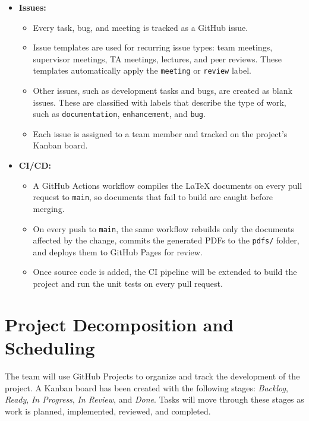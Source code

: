 \documentclass{article}
\begin{document}
\begin{itemize}
\begin{itemize}
    \item Once working software exists, each demonstration (the proof of
    concept, Revision~0, and Revision~1) is also published as a GitHub
    Release from its tag, with a short summary of the features included.
  \end{itemize}
  \item \textbf{Issues:}
  \begin{itemize}
    \item Every task, bug, and meeting is tracked as a GitHub issue.
    \item Issue templates are used for recurring issue types: team meetings,
    supervisor meetings, TA meetings, lectures, and peer reviews. These
    templates automatically apply the \texttt{meeting} or \texttt{review}
    label.
    \item Other issues, such as development tasks and bugs, are created as
    blank issues. These are classified with labels that describe the type of
    work, such as \texttt{documentation}, \texttt{enhancement}, and
    \texttt{bug}.
    \item Each issue is assigned to a team member and tracked on the
    project's Kanban board.
  \end{itemize}
  \item \textbf{CI/CD:}
  \begin{itemize}
    \item A GitHub Actions workflow compiles the LaTeX documents on every
    pull request to \texttt{main}, so documents that fail to build are
    caught before merging.
    \item On every push to \texttt{main}, the same workflow rebuilds only
    the documents affected by the change, commits the generated PDFs to the
    \texttt{pdfs/} folder, and deploys them to GitHub Pages for review.
    \item Once source code is added, the CI pipeline will be extended to
    build the project and run the unit tests on every pull request.
  \end{itemize}
\end{itemize}

\section{Project Decomposition and Scheduling}

The team will use GitHub Projects to organize and track the development of the
project. A Kanban board has been created with the following stages:
\textit{Backlog}, \textit{Ready}, \textit{In Progress}, \textit{In Review}, and
\textit{Done}. Tasks will move through these stages as work is planned,
implemented, reviewed, and completed.
\end{document}
